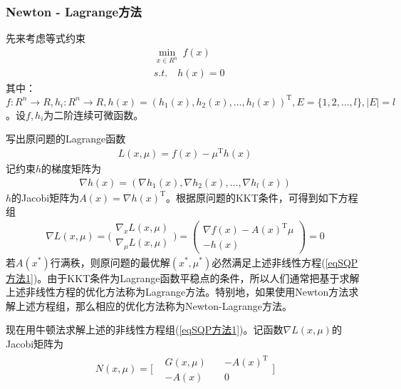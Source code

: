         \subsubsection{Newton - Lagrange方法}
            \par
            先来考虑等式约束
            \begin{align*}
            &\mathop {\min}\limits_{x\in R^n} \ f(x)\\
            &s.t.\quad h(x) = 0
            \end{align*}
            其中：$f:R^n \to R,h_i:R^n \to R,h(x)=(h_1(x),h_2(x),\ldots,h_l(x))^\mathrm{T} ,E=\{1,2,\ldots,l\},|E|=l$。设$f,h_i$为二阶连续可微函数。
            \par
            写出原问题的Lagrange函数
            \begin{align*}
            L(x,\mu)=f(x)-{\mu}^\mathrm{T}  h(x)
            \end{align*}
            记约束$h$的梯度矩阵为
            \begin{align*}
            \nabla h(x)=(\nabla h_1(x),\nabla h_2(x),\ldots,\nabla h_l(x))
            \end{align*}
            $h$的Jacobi矩阵为$A(x)=\nabla h(x)^\mathrm{T} $。根据原问题的KKT条件，可得到如下方程组
            \begin{align}
            \label{eqSQP方法1}
            \nabla L(x,\mu)=\bigg(\begin{aligned}{\nabla}_x L(x,\mu)\\
            {\nabla}_{\mu} L(x,\mu)\end{aligned}\bigg)
            =
            \begin{pmatrix}
            \nabla f(x)-A(x)^\mathrm{T} {\mu}\\
            -h(x)
            \end{pmatrix}
            =0
            \end{align}
            若$A(x^*)$行满秩，则原问题的最优解$(x^*,{\mu}^*)$必然满足上述非线性方程(\ref{eqSQP方法1})。由于KKT条件为Lagrange函数平稳点的条件，所以人们通常把基于求解上述非线性方程的优化方法称为Lagrange方法。特别地，如果使用Newton方法求解上述方程组，那么相应的优化方法称为Newton-Lagrange方法。
            \par
            现在用牛顿法求解上述的非线性方程组(\ref{eqSQP方法1})。记函数$\nabla L(x,\mu)$的Jacobi矩阵为
            \begin{align*}
            N(x,\mu)=\bigg[\begin{matrix}& G(x,\mu)\quad & -A(x)^\mathrm{T} \\
            & -A(x)\quad & 0\end{matrix}\bigg]
            \end{align*}
